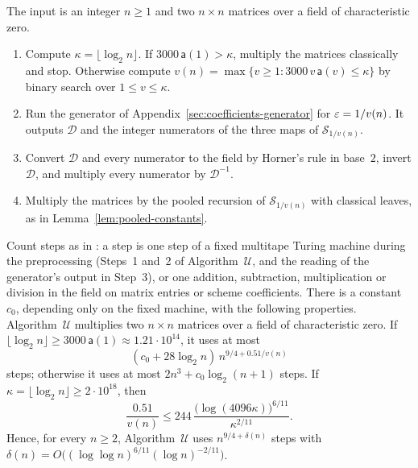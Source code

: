 \begin{definition}\label{def:algorithm-uniform}
The input is an integer \(n\ge1\) and two \(n\times n\) matrices over a
field of characteristic zero.
\begin{enumerate}
\item Compute \(\kappa=\lfloor\log_2n\rfloor\). If
 \(3000\,\mathsf a(1)>\kappa\), multiply the matrices classically and
 stop. Otherwise compute
 \(v(n)=\max\{v\ge1:3000\,v\,\mathsf a(v)\le\kappa\}\) by binary search
 over \(1\le v\le\kappa\).
\item Run the generator of Appendix~\ref{sec:coefficients-generator} for
 \(\varepsilon=1/v(n)\). It outputs \(\mathcal D\) and the integer numerators of
 the three maps of \(\mathcal S_{1/v(n)}\).
\item Convert \(\mathcal D\) and every numerator to the field by Horner's
 rule in base~\(2\), invert \(\mathcal D\), and multiply every numerator
 by \(\mathcal D^{-1}\).
\item Multiply the matrices by the pooled recursion of
 \(\mathcal S_{1/v(n)}\) with classical leaves, as in
 Lemma~\ref{lem:pooled-constants}.
\end{enumerate}
\end{definition}

\begin{theorem}\label{thm:uniform}
Count steps as in \citep[Corollary~9.7]{FinCon26}: a step is one step of a
fixed multitape Turing machine during the preprocessing (Steps~1 and~2 of
Algorithm~\(\mathcal U\), and the reading of the generator's output in
Step~3), or one addition, subtraction, multiplication or division in the
field on matrix entries or scheme coefficients. There is a constant
\(c_0\), depending only on the fixed machine, with the following
properties. Algorithm~\(\mathcal U\) multiplies two \(n\times n\) matrices
over a field of characteristic zero. If
\(\lfloor\log_2n\rfloor\ge3000\,\mathsf a(1)\approx1.21\cdot10^{14}\), it
uses at most
\[
 (c_0+28\log_2n)\,n^{9/4+0.51/v(n)}
\]
steps; otherwise it uses at most \(2n^3+c_0\log_2(n+1)\) steps. If
\(\kappa=\lfloor\log_2n\rfloor\ge2\cdot10^{18}\), then
\begin{equation}\label{eq:seeds-rate}
 \frac{0.51}{v(n)}\le244\,
 \frac{\bigl(\log(4096\kappa)\bigr)^{6/11}}{\kappa^{2/11}} .
\end{equation}
Hence, for every \(n\ge2\), Algorithm~\(\mathcal U\) uses
\(n^{9/4+\delta(n)}\) steps with \(\delta(n)=O\bigl((\log\log n)^{6/11}(\log n)^{-2/11}\bigr)\).
\end{theorem}

